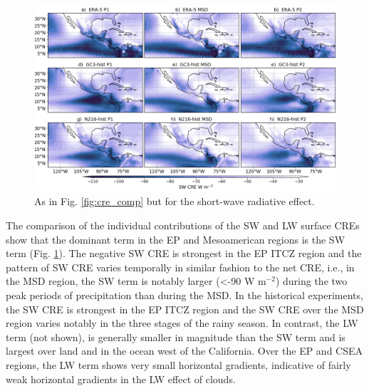 \begin{figure}[t!]
\includegraphics[width=\linewidth]{figures/fig4_swclim_3.png}
\caption[Short-wave cloud radiative effect composites]{As in Fig. \ref{fig:cre_comp} but for the short-wave radiative effect.}
\label{fig:sw_comp}
\end{figure}

The comparison of the individual contributions of the SW and LW surface CREs show that the dominant term in the EP and Mesoamerican regions is the SW term (Fig. \ref{fig:sw_comp}). The negative SW CRE is strongest in the EP ITCZ region and the pattern of SW CRE varies temporally in similar fashion to the net CRE, i.e., in the MSD region, the SW term is notably larger (<-90 W m$^{-2}$) during the two peak periods of precipitation than during the MSD.
In the historical experiments, the SW CRE is strongest in the EP ITCZ region and the SW CRE over the MSD region varies notably in the three stages of the rainy season.
In contrast, the LW term (not shown), is generally smaller in magnitude than the SW term and is largest over land and in the ocean west of the California. Over the EP and CSEA regions, the LW term shows very small horizontal gradients, indicative of fairly weak horizontal gradients in the LW effect of clouds. 
%

